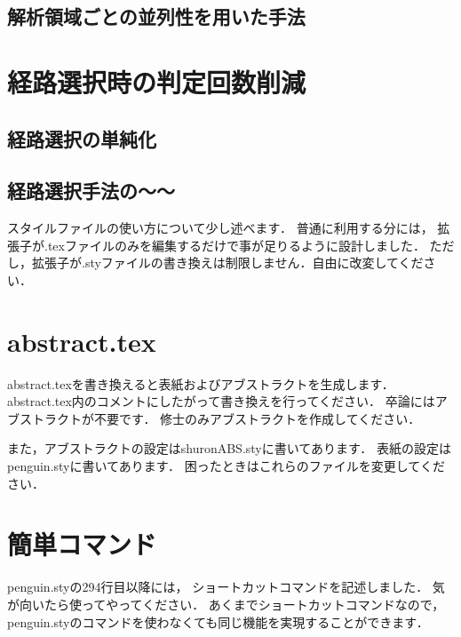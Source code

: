 \clearpage

\subsection{解析領域ごとの並列性を用いた手法}

\section{経路選択時の判定回数削減}

\subsection{経路選択の単純化}

\subsection{経路選択手法の～～}




スタイルファイルの使い方について少し述べます．
普通に利用する分には，
拡張子が.texファイルのみを編集するだけで事が足りるように設計しました．
ただし，拡張子が.styファイルの書き換えは制限しません．自由に改変してください．


\section{abstract.tex}
abstract.texを書き換えると表紙およびアブストラクトを生成します．
abstract.tex内のコメントにしたがって書き換えを行ってください．
卒論にはアブストラクトが不要です．
修士のみアブストラクトを作成してください．

また，アブストラクトの設定はshuronABS.styに書いてあります．
表紙の設定はpenguin.styに書いてあります．
困ったときはこれらのファイルを変更してください．

\section{簡単コマンド}

penguin.styの294行目以降には， ショートカットコマンドを記述しました．
気が向いたら使ってやってください．
あくまでショートカットコマンドなので，
penguin.styのコマンドを使わなくても同じ機能を実現することができます．

